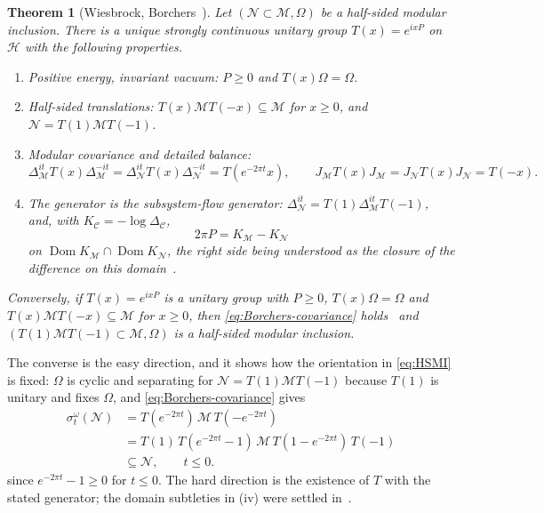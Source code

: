 \documentclass[a4paper,11pt]{article}
\newtheorem{theorem}{Theorem}
\theoremstyle{definition}
\newcommand{\nn}{\nonumber}
\newcommand{\mN}{\mathcal{N}}
\newcommand{\mM}{\mathcal{M}}
\begin{document}
\begin{theorem}[Wiesbrock, Borchers~{\cite{Wiesbrock1993,Borchers1992,ArakiZsido2005}}]\label{thm:HSMI}
Let $(\mN\subset\mM,\Omega)$ be a half-sided modular inclusion. There is a unique strongly continuous unitary group $T(x)=e^{ixP}$ on $\mathcal H$ with the following properties.
\begin{enumerate}
 \item[\rm(i)] \emph{Positive energy, invariant vacuum:} $P\ge0$ and $T(x)\Omega=\Omega$.
 \item[\rm(ii)] \emph{Half-sided translations:} $T(x)\mM T(-x)\subseteq\mM$ for $x\ge0$, and $\mN=T(1)\mM T(-1)$.
 \item[\rm(iii)] \emph{Modular covariance and detailed balance:}
 \begin{equation}
  \Delta_{\mM}^{it}T(x)\Delta_{\mM}^{-it}=\Delta_{\mN}^{it}T(x)\Delta_{\mN}^{-it}=T(e^{-2\pi t}x),
  \qquad
  J_{\mM}T(x)J_{\mM}=J_{\mN}T(x)J_{\mN}=T(-x).
  \label{eq:Borchers-covariance}
 \end{equation}
 \item[\rm(iv)] \emph{The generator is the subsystem-flow generator:} $\Delta_{\mN}^{it}=T(1)\Delta_{\mM}^{it}T(-1)$, and, with $K_{\mathcal C}=-\log\Delta_{\mathcal C}$,
 \begin{equation}
  2\pi P=K_{\mM}-K_{\mN}
  \label{eq:HSMI-P}
 \end{equation}
 on $\operatorname{Dom}K_{\mM}\cap\operatorname{Dom}K_{\mN}$, the right side being understood as the closure of the difference on this domain~\cite{ArakiZsido2005}.
\end{enumerate}
Conversely, if $T(x)=e^{ixP}$ is a unitary group with $P\ge0$, $T(x)\Omega=\Omega$ and $T(x)\mM T(-x)\subseteq\mM$ for $x\ge0$, then \eqref{eq:Borchers-covariance} holds~\cite{Borchers1992} and $(T(1)\mM T(-1)\subset\mM,\Omega)$ is a half-sided modular inclusion.
\end{theorem}

The converse is the easy direction, and it shows how the orientation in \eqref{eq:HSMI} is fixed: $\Omega$ is cyclic and separating for $\mN=T(1)\mM T(-1)$ because $T(1)$ is unitary and fixes $\Omega$, and \eqref{eq:Borchers-covariance} gives
\begin{align}
 \sigma^\omega_t(\mN)
 &=T(e^{-2\pi t})\,\mM\,T(-e^{-2\pi t})\nn\\
 &=T(1)\,T(e^{-2\pi t}-1)\,\mM\,T(1-e^{-2\pi t})\,T(-1)\nn\\
 &\subseteq\mN,\qquad t\le0.
 \label{eq:HSMI-orbit}
\end{align}
since $e^{-2\pi t}-1\ge0$ for $t\le0$. The hard direction is the existence of $T$ with the stated generator; the domain subtleties in (iv) were settled in~\cite{ArakiZsido2005}.
\end{document}
